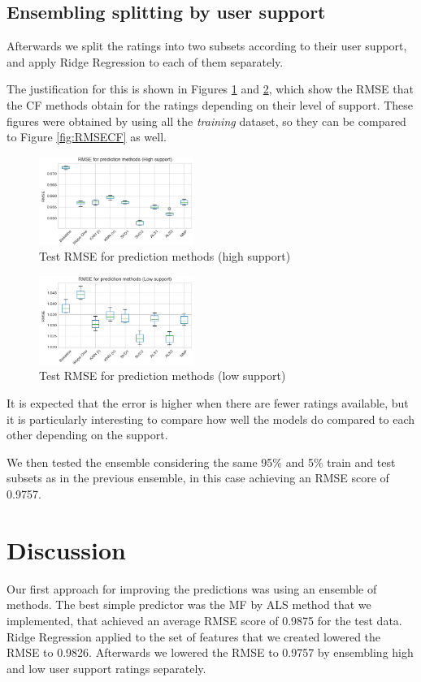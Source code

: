 \documentclass[10pt,conference,compsocconf]{IEEEtran}
\begin{document}
  \subsection{Ensembling splitting by user support} %
  \label{sub:ensembling_considering_user_support}
    Afterwards we split the ratings into two subsets according to their user support, and apply Ridge Regression to each of them separately.

    The justification for this is shown in Figures \ref{fig:RMSECFH} and \ref{fig:RMSECFL}, which show the RMSE that the CF methods obtain for the ratings depending on their level of support. These figures were obtained by using all the \emph{training} dataset, so they can be compared to Figure \ref{fig:RMSECF} as well.
    \begin{figure}[htp]
      \centering
      \includegraphics[width=0.45\textwidth]{RMSECFH}
      \caption{Test RMSE for prediction methods (high support)}
      \label{fig:RMSECFH}
    \end{figure}
    \begin{figure}[htp]
      \centering
      \includegraphics[width=0.45\textwidth]{RMSECFL}
      \caption{Test RMSE for prediction methods (low support)}
      \label{fig:RMSECFL}
    \end{figure}
    It is expected that the error is higher when there are fewer ratings available, but it is particularly interesting to compare how well the models do compared to each other depending on the support.

    We then tested the ensemble considering the same 95\% and 5\% train and test subsets as in the previous ensemble, in this case achieving an RMSE score of 0.9757.
\section{Discussion}
\label{sec:discussion}
  Our first approach for improving the predictions was using an ensemble of methods. The best simple predictor was the MF by ALS method that we implemented, that achieved an average RMSE score of 0.9875 for the test data. Ridge Regression applied to the set of features that we created lowered the RMSE to 0.9826.
  Afterwards we lowered the RMSE to 0.9757 by ensembling high and low user support ratings separately.
\end{document}
